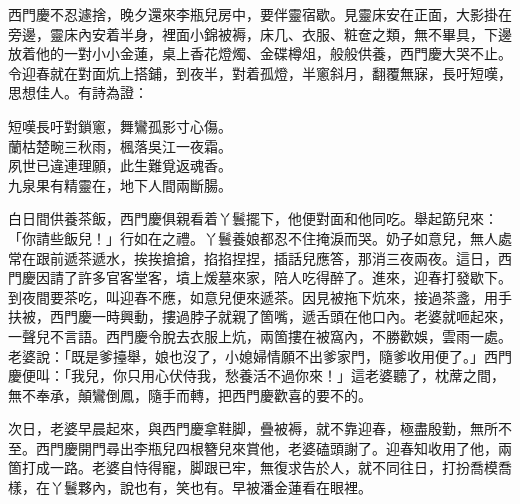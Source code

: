 西門慶不忍遽捨，晚夕還來李瓶兒房中，要伴靈宿歇。見靈床安在正面，大影掛在旁邊，靈床內安着半身，裡面小錦被褥，床几、衣服、粧奩之類，無不畢具，下邊放着他的一對小小金蓮，{}桌上香花燈燭、金碟樽俎，般般供養，西門慶大哭不止。令迎春就在對面炕上搭鋪，到夜半，對着孤燈，半窻斜月，翻覆無寐，長吁短嘆，思想佳人。有詩為證：

\begin{myquote} 
短嘆長吁對鎖窻，舞鸞孤影寸心傷。\\蘭枯楚畹三秋雨，楓落吳江一夜霜。\\夙世已違連理願，此生難覓返魂香。\\九泉果有精靈在，地下人間兩斷腸。
\end{myquote} 

白日間供養茶飯，西門慶俱親看着丫鬟擺下，他便對面和他同吃。舉起筯兒來：「你請些飯兒！」{}行如在之禮。丫鬟養娘都忍不住掩淚而哭。奶子如意兒，無人處常在跟前遞茶遞水，挨挨搶搶，掐掐捏捏，插話兒應答，那消三夜兩夜。{}這日，西門慶因請了許多官客堂客，墳上煖墓來家，陪人吃得醉了。進來，迎春打發歇下。到夜間要茶吃，叫迎春不應，如意兒便來遞茶。因見被拖下炕來，接過茶盞，用手扶被，西門慶一時興動，摟過脖子就親了箇嘴，遞舌頭在他口內。老婆就咂起來，一聲兒不言語。西門慶令脫去衣服上炕，兩箇摟在被窩內，不勝歡娛，雲雨一處。老婆說：「既是爹擡舉，娘也沒了，小媳婦情願不出爹家門，隨爹收用便了。」西門慶便叫：「我兒，你只用心伏侍我，愁養活不過你來！」這老婆聽了，枕蓆之間，無不奉承，顛鸞倒鳳，隨手而轉，{}把西門慶歡喜的要不的。

次日，老婆早晨起來，與西門慶拿鞋脚，疊被褥，就不靠迎春，極盡殷勤，無所不至。西門慶開門尋出李瓶兒四根簪兒來賞他，老婆磕頭謝了。迎春知收用了他，兩箇打成一路。老婆自恃得寵，脚跟已牢，無復求告於人，就不同往日，打扮喬模喬樣，在丫鬟夥內，說也有，笑也有。{}早被潘金蓮看在眼裡。

